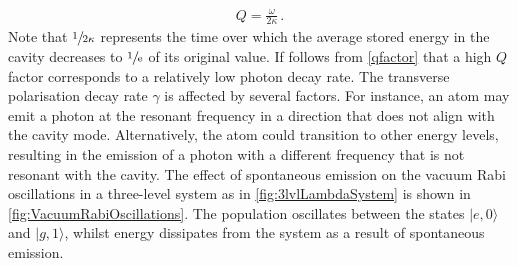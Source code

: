 \documentclass[../Thesis-IJspeert.tex]{subfiles}
\begin{document}
\begin{align}
\label{qfactor}
	Q = \frac{\omega}{2\kappa}\,.
\end{align}
Note that $\sfrac{1}{2\kappa}$ represents the time over which the average stored energy in the cavity decreases to $\sfrac{1}{\mathrm{e}}$ of its original value. If follows from \autoref{qfactor} that a high $Q$ factor corresponds to a relatively low photon decay rate. The transverse polarisation decay rate $\gamma$ is affected by several factors. For instance, an atom may emit a photon at the resonant frequency in a direction that does not align with the cavity mode. Alternatively, the atom could transition to other energy levels, resulting in the emission of a photon with a different frequency that is not resonant with the cavity. The effect of spontaneous emission on the vacuum Rabi oscillations in a three-level system as in \autoref{fig:3lvlLambdaSystem} is shown in \autoref{fig:VacuumRabiOscillations}. The population oscillates between the states $\vert e, 0 \rangle$ and $\vert g, 1 \rangle$, whilst energy dissipates from the system as a result of spontaneous emission.
\end{document}
